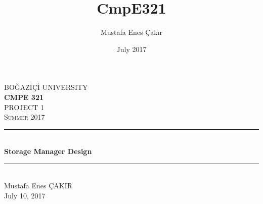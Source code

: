 \documentclass[12pt,a4paper]{article}
\title{CmpE321}
\author{Mustafa Enes Çakır}
\date{July 2017}
\begin{document}
\begin{titlepage}

\newcommand{\HRule}{\rule{\linewidth}{0.5mm}}

\center %


\textsc{\LARGE BOĞAZİÇİ UNIVERSITY}\\[1.5cm] %
\textbf{\Large CMPE 321}\\[0.5cm] %
\textsc{\large PROJECT 1}\\[2cm] %
\textsc{\large Summer 2017}\\[3cm] %


\HRule \\[0.4cm]
{ \huge \bfseries Storage Manager Design}\\[0.4cm] %
\HRule \\[4cm]


\Large Mustafa Enes ÇAKIR \\ [3cm] %


{\large July 10, 2017}\\[2cm] %
\vfill %
\end{titlepage}

\tableofcontents{}

\break
\end{document}
